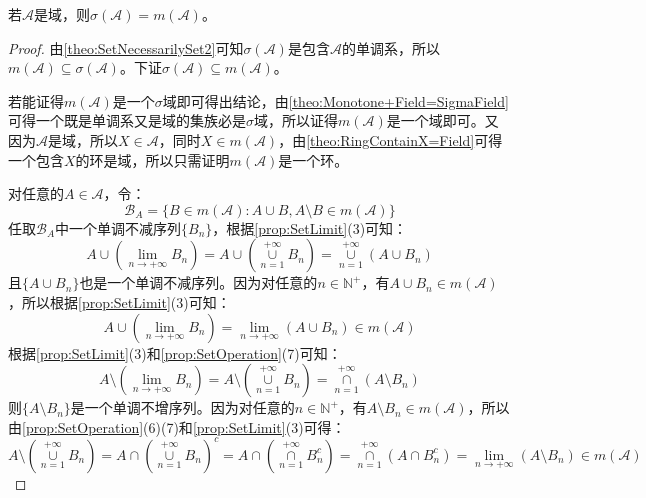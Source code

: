 \begin{theorem}\label{theo:SigmaField=MonotoneField}
	若$\mathscr{A}$是域，则$\sigma(\mathscr{A})=m(\mathscr{A})$。
\end{theorem}
\begin{proof}
	由\cref{theo:SetNecessarilySet2}可知$\sigma(\mathscr{A})$是包含$\mathscr{A}$的单调系，所以$m(\mathscr{A})\subseteq\sigma(\mathscr{A})$。下证$\sigma(\mathscr{A})\subseteq m(\mathscr{A})$。\par
	若能证得$m(\mathscr{A})$是一个$\sigma$域即可得出结论，由\cref{theo:Monotone+Field=SigmaField}可得一个既是单调系又是域的集族必是$\sigma$域，所以证得$m(\mathscr{A})$是一个域即可。又因为$\mathscr{A}$是域，所以$X\in\mathscr{A}$，同时$X\in m(\mathscr{A})$，由\cref{theo:RingContainX=Field}可得一个包含$X$的环是域，所以只需证明$m(\mathscr{A})$是一个环。\par
	对任意的$A\in\mathscr{A}$，令：
	\begin{equation*}
		\mathscr{B}_A=\{B\in m(\mathscr{A}):A\cup B,A\setminus B\in m(\mathscr{A})\}
	\end{equation*}
	任取$\mathscr{B}_A$中一个单调不减序列$\{B_n\}$，根据\cref{prop:SetLimit}(3)可知：
	\begin{equation*}
		A\cup\left(\lim_{n\to+\infty}B_n\right)=A\cup\left(\underset{n=1}{\overset{+\infty}{\cup}}B_n\right)
		=\underset{n=1}{\overset{+\infty}{\cup}}(A\cup B_n)
	\end{equation*}
	且$\{A\cup B_n\}$也是一个单调不减序列。因为对任意的$n\in\mathbb{N}^+$，有$A\cup B_n\in m(\mathscr{A})$，所以根据\cref{prop:SetLimit}(3)可知：
	\begin{equation*}
		A\cup\left(\lim_{n\to+\infty}B_n\right)=\lim_{n\to+\infty}(A\cup B_n)\in m(\mathscr{A})
	\end{equation*}
	根据\cref{prop:SetLimit}(3)和\cref{prop:SetOperation}(7)可知：
	\begin{equation*}
		A\setminus\left(\lim_{n\to+\infty}B_n\right)=A\setminus\left(\underset{n=1}{\overset{+\infty}{\cup}}B_n\right)
		=\underset{n=1}{\overset{+\infty}{\cap}}(A\setminus B_n)
	\end{equation*}
	则$\{A\setminus B_n\}$是一个单调不增序列。因为对任意的$n\in\mathbb{N}^+$，有$A\setminus B_n\in m(\mathscr{A})$，所以由\cref{prop:SetOperation}(6)(7)和\cref{prop:SetLimit}(3)可得：
	\begin{equation*}
		A\setminus\left(\underset{n=1}{\overset{+\infty}{\cup}}B_n\right)=A\cap\left(\underset{n=1}{\overset{+\infty}{\cup}}B_n\right)^c=A\cap\left(\underset{n=1}{\overset{+\infty}{\cap}}B_n^c\right)=\underset{n=1}{\overset{+\infty}{\cap}}(A\cap B_n^c)=\lim_{n\to+\infty}(A\setminus B_n)\in m(\mathscr{A})

\end{equation*}
\end{proof}
